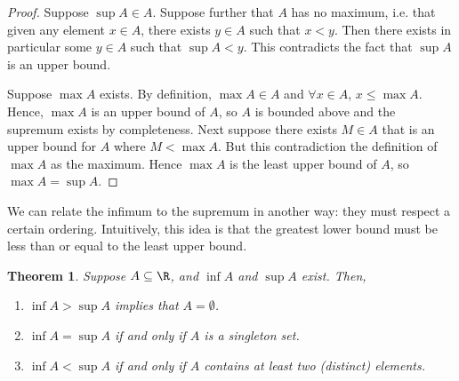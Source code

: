 \documentclass[letterpaper,11pt]{article}
\newtheorem{thm}{Theorem}
\begin{document}
\begin{proof}
  Suppose $\sup A \in A$. Suppose further that $A$ has no maximum, i.e. that
  given any element $x \in A$, there exists $y \in A$ such that $x < y$. Then
  there exists in particular some $y \in A$ such that $\sup A < y$. This
  contradicts the fact that $\sup A$ is an upper bound.

  Suppose $\max A$ exists. By definition, $\max A \in A$ and
  $\forall x \in A$, $x \leq \max A$. Hence, $\max A$ is an upper bound of $A$,
  so $A$ is bounded above and the supremum exists by completeness. Next suppose
  there exists $M \in A$ that is an upper bound for $A$ where $M < \max A$.
  But this contradiction the definition of $\max A$ as the maximum.
  Hence $\max A$ is the least upper bound of $A$, so $\max A = \sup A$.
\end{proof}

We can relate the infimum to the supremum in another way: they must respect a
certain ordering. Intuitively, this idea is that the greatest lower bound must
be less than or equal to the least upper bound.

\begin{thm}
  Suppose $A \subseteq \R$, and $\inf A$ and $\sup A$ exist.
  Then,
  \begin{enumerate}
    \item $\inf A > \sup A$ implies that $A = \emptyset$.
    \item $\inf A = \sup A$ if and only if $A$ is a singleton set.
    \item $\inf A < \sup A$ if and only if $A$ contains at least two (distinct)
      elements.
  \end{enumerate}
\end{thm}
\end{document}
